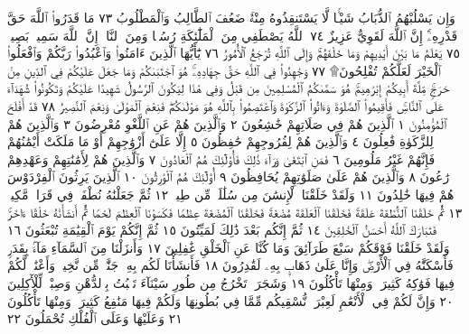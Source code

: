وَإِن يَسْلُبْهُمُ ٱلذُّبَابُ شَيْـࣰٔا لَّا يَسْتَنقِذُوهُ مِنْهُۚ
ضَعُفَ ٱلطَّالِبُ وَٱلْمَطْلُوبُ ٧٣ مَا قَدَرُوا۟ ٱللَّهَ حَقَّ قَدْرِهِۦٓۚ
إِنَّ ٱللَّهَ لَقَوِيٌّ عَزِيزٌ ٧٤ ٱللَّهُ يَصْطَفِي مِنَ ٱلْمَلَٰٓئِكَةِ
رُسُلࣰا وَمِنَ ٱلنَّاسِۚ إِنَّ ٱللَّهَ سَمِيعُۢ بَصِيرࣱ ٧٥ يَعْلَمُ
مَا بَيْنَ أَيْدِيهِمْ وَمَا خَلْفَهُمْۚ وَإِلَى ٱللَّهِ تُرْجَعُ ٱلْأُمُورُ ٧٦
يَٰٓأَيُّهَا ٱلَّذِينَ ءَامَنُوا۟  وَٱعْبُدُوا۟
رَبَّكُمْ وَٱفْعَلُوا۟ ٱلْخَيْرَ لَعَلَّكُمْ تُفْلِحُونَ۩ ٧٧
وَجَٰهِدُوا۟ فِي ٱللَّهِ حَقَّ جِهَادِهِۦۚ هُوَ ٱجْتَبَىٰكُمْ
وَمَا جَعَلَ عَلَيْكُمْ فِي ٱلدِّينِ مِنْ حَرَجࣲۚ مِّلَّةَ أَبِيكُمْ
إِبْرَٰهِيمَۚ هُوَ سَمَّىٰكُمُ ٱلْمُسْلِمِينَ مِن قَبْلُ وَفِي
هَٰذَا لِيَكُونَ ٱلرَّسُولُ شَهِيدًا عَلَيْكُمْ وَتَكُونُوا۟
شُهَدَآءَ عَلَى ٱلنَّاسِۚ فَأَقِيمُوا۟ ٱلصَّلَوٰةَ وَءَاتُوا۟ ٱلزَّكَوٰةَ
وَٱعْتَصِمُوا۟ بِٱللَّهِ هُوَ مَوْلَىٰكُمْۖ فَنِعْمَ ٱلْمَوْلَىٰ وَنِعْمَ ٱلنَّصِيرُ ٧٨
قَدْ أَفْلَحَ ٱلْمُؤْمِنُونَ ١ ٱلَّذِينَ هُمْ فِي صَلَاتِهِمْ خَٰشِعُونَ ٢
وَٱلَّذِينَ هُمْ عَنِ ٱللَّغْوِ مُعْرِضُونَ ٣ وَٱلَّذِينَ هُمْ لِلزَّكَوٰةِ
فَٰعِلُونَ ٤ وَٱلَّذِينَ هُمْ لِفُرُوجِهِمْ حَٰفِظُونَ ٥ إِلَّا عَلَىٰٓ
أَزْوَٰجِهِمْ أَوْ مَا مَلَكَتْ أَيْمَٰنُهُمْ فَإِنَّهُمْ غَيْرُ مَلُومِينَ ٦ فَمَنِ ٱبْتَغَىٰ
وَرَآءَ ذَٰلِكَ فَأُو۟لَٰٓئِكَ هُمُ ٱلْعَادُونَ ٧ وَٱلَّذِينَ هُمْ لِأَمَٰنَٰتِهِمْ
وَعَهْدِهِمْ رَٰعُونَ ٨ وَٱلَّذِينَ هُمْ عَلَىٰ صَلَوَٰتِهِمْ يُحَافِظُونَ ٩ أُو۟لَٰٓئِكَ
هُمُ ٱلْوَٰرِثُونَ ١٠ ٱلَّذِينَ يَرِثُونَ ٱلْفِرْدَوْسَ هُمْ فِيهَا خَٰلِدُونَ ١١
وَلَقَدْ خَلَقْنَا ٱلْإِنسَٰنَ مِن سُلَٰلَةࣲ مِّن طِينࣲ ١٢ ثُمَّ جَعَلْنَٰهُ نُطْفَةࣰ
فِي قَرَارࣲ مَّكِينࣲ ١٣ ثُمَّ خَلَقْنَا ٱلنُّطْفَةَ عَلَقَةࣰ فَخَلَقْنَا ٱلْعَلَقَةَ
مُضْغَةࣰ فَخَلَقْنَا ٱلْمُضْغَةَ عِظَٰمࣰا فَكَسَوْنَا ٱلْعِظَٰمَ لَحْمࣰا ثُمَّ
أَنشَأْنَٰهُ خَلْقًا ءَاخَرَۚ فَتَبَارَكَ ٱللَّهُ أَحْسَنُ ٱلْخَٰلِقِينَ ١٤ ثُمَّ
إِنَّكُم بَعْدَ ذَٰلِكَ لَمَيِّتُونَ ١٥ ثُمَّ إِنَّكُمْ يَوْمَ ٱلْقِيَٰمَةِ تُبْعَثُونَ ١٦
وَلَقَدْ خَلَقْنَا فَوْقَكُمْ سَبْعَ طَرَآئِقَ وَمَا كُنَّا عَنِ ٱلْخَلْقِ غَٰفِلِينَ ١٧
وَأَنزَلْنَا مِنَ ٱلسَّمَآءِ مَآءَۢ بِقَدَرࣲ فَأَسْكَنَّٰهُ فِي ٱلْأَرْضِۖ وَإِنَّا عَلَىٰ
ذَهَابِۭ بِهِۦ لَقَٰدِرُونَ ١٨ فَأَنشَأْنَا لَكُم بِهِۦ جَنَّٰتࣲ مِّن نَّخِيلࣲ
وَأَعْنَٰبࣲ لَّكُمْ فِيهَا فَوَٰكِهُ كَثِيرَةࣱ وَمِنْهَا تَأْكُلُونَ ١٩ وَشَجَرَةࣰ
تَخْرُجُ مِن طُورِ سَيْنَآءَ تَنۢبُتُ بِٱلدُّهْنِ وَصِبْغࣲ لِّلْأٓكِلِينَ ٢٠
وَإِنَّ لَكُمْ فِي ٱلْأَنْعَٰمِ لَعِبْرَةࣰۖ نُّسْقِيكُم مِّمَّا فِي بُطُونِهَا وَلَكُمْ فِيهَا
مَنَٰفِعُ كَثِيرَةࣱ وَمِنْهَا تَأْكُلُونَ ٢١ وَعَلَيْهَا وَعَلَى ٱلْفُلْكِ تُحْمَلُونَ ٢٢
